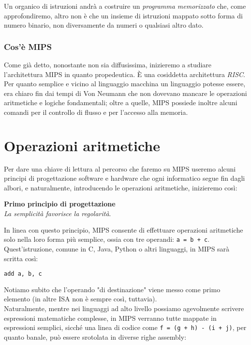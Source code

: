 Un organico di istruzioni andrà a costruire un \emph{programma memorizzato} che, come approfondiremo, altro non è che un insieme di istruzioni mappato sotto forma di numero binario, non diversamente da numeri o qualsiasi altro dato.

\subsubsection{Cos'è MIPS}
Come già detto, nonostante non sia diffusissima, inizieremo a studiare l'architettura MIPS in quanto propedeutica. È una cosiddetta architettura \emph{RISC}. Per quanto semplice e vicino al linguaggio macchina un linguaggio potesse essere, era chiaro fin dai tempi di Von Neumann che non dovevano mancare le operazioni aritmetiche e logiche fondamentali; oltre a quelle, MIPS possiede inoltre alcuni comandi per il controllo di flusso e per l'accesso alla memoria.

\section{Operazioni aritmetiche}
Per dare una chiave di lettura al percorso che faremo su MIPS useremo alcuni principi di progettazione software e hardware che ogni informatico segue fin dagli albori, e naturalmente, introducendo le operazioni aritmetiche, inizieremo così:

\vspace{8pt}
\begin{tcolorbox}
\centering
\textbf{Primo principio di progettazione}\\
\emph{La semplicità favorisce la regolarità}.
\end{tcolorbox}
\vspace{5pt}

In linea con questo principio, MIPS consente di effettuare operazioni aritmetiche solo nella loro forma più semplice, ossia con tre operandi: \texttt{a = b + c}.
Quest'istruzione, comune in C, Java, Python o altri linguaggi, in MIPS sarà scritta così:
\begin{verbatim}
add a, b, c
\end{verbatim}

Notiamo subito che l'operando "di destinazione" viene messo come primo elemento (in altre ISA non è sempre così, tuttavia).\\
Naturalmente, mentre nei linguaggi ad alto livello possiamo agevolmente scrivere espressioni matematiche complesse, in MIPS verranno tutte mappate in espressioni semplici, sicché una linea di codice come \texttt{f = (g + h) - (i + j)}, per quanto banale, può essere srotolata in diverse righe assembly:

